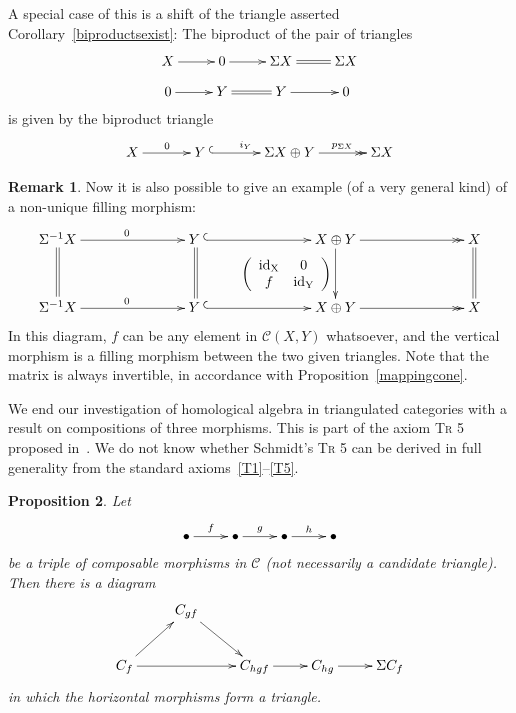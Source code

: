 \documentclass{amsproc}
\newtheorem{prop}{Proposition}[section]
\theoremstyle{definition}
\newtheorem{rem}[prop]{Remark}
\begin{document}
A special case of this is a shift of the triangle asserted Corollary~\ref{biproductsexist}: The biproduct of the pair of triangles
\begin{displaymath}
\xymatrix@R-15pt{X\ar[r] & 0 \ar[r] & \Sigma X\ar@{=}[r] & \Sigma X\\
0\ar[r] & Y\ar@{=}[r] & Y\ar[r] & 0}
\end{displaymath}
is given by the biproduct triangle
\begin{displaymath}
\xymatrix@+10pt{X\ar[r]^0 & Y\:\ar@{^{(}->}[r]^{i_Y} & \Sigma X\oplus Y\ar@{->>}[r]^(.57){p_{\Sigma X}} & \Sigma X}
\end{displaymath}

\begin{rem}
\label{nonuniquefm}
Now it is also possible to give an example (of a very general kind) of a non-unique filling morphism:
\begin{displaymath}
\xymatrix@+10pt{{}\Sigma^{-1}X\ar[rr]^0\ar@{=}[d] && Y\:\ar@{^{(}->}[rr]\ar@{=}[d] && X\oplus Y\ar@{->>}[rr]\ar[d]_{\left(\begin{array}{cc}\mathrm{id_X}&0\\f&\mathrm{id_Y}\end{array}\right)} && X\ar@{=}[d]\\{}
\Sigma^{-1}X\ar[rr]^0 && Y\:\ar@{^{(}->}[rr] && X\oplus Y\ar@{->>}[rr] && X}
\end{displaymath}
In this diagram, $f$ can be any element in ${\mathcal{C}}(X,Y)$ whatsoever, and the vertical morphism is a filling morphism between the two given triangles. Note that the matrix is always invertible, in accordance with Proposition~\ref{mappingcone}.
\end{rem}

We end our investigation of homological algebra in triangulated categories with a result on compositions of three morphisms. This is part of the axiom \textsc{Tr 5} proposed in~\cite{Schm}. We do not know whether Schmidt's \textsc{Tr 5} can be derived in full generality from the standard axioms~\ref{T1}--\ref{T5}.

\begin{prop}
\label{triplecomp}
Let
\[
\xymatrix{ \bullet \ar[r]^f & \bullet \ar[r]^g & \bullet \ar[r]^h & \bullet }
\]
be a triple of composable morphisms in ${\mathcal{C}}$ (not necessarily a candidate triangle). Then there is a diagram
\[
\xymatrix{ & C_{gf} \ar[dr] \\
C_f \ar[ur] \ar[rr] & & C_{hgf} \ar[r] & C_{hg} \ar[r] & \Sigma C_f }
\]
in which the horizontal morphisms form a triangle.
\end{prop}
\end{document}
